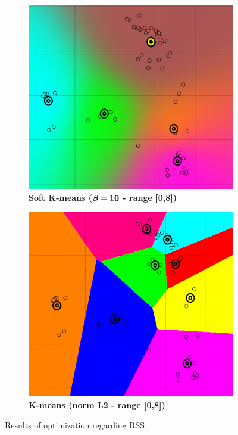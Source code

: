 \begin{figure} [h]
\centering
	\begin{subfigure}[h]{0.45\textwidth}
    \centering
	\includegraphics[height=0.08\textheight]{./clustering/opt_RSS_k_soft_beta_10_range8.png}
	\caption{\bf Soft K-means ($\boldsymbol \beta \bf = 10$ - range [0,8])}
	\end{subfigure}
    \begin{subfigure}[h]{0.45\textwidth}
    \centering
    \includegraphics[height=0.08\textheight]{./clustering/opt_RSS_k_mean_L2_range8.png}
	\caption{\bf K-means (norm L2 - range [0,8])}
    \end{subfigure}
\caption{Results of optimization regarding RSS}
\label{fig:figure7}
\end{figure}

